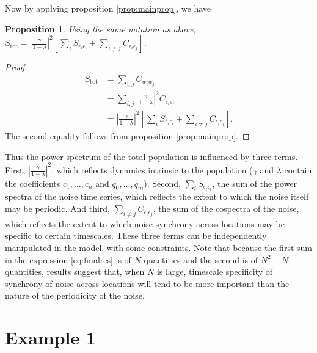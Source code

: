 \documentclass[letterpaper,11pt]{article}
\newtheorem{proposition}[theorem]{Proposition}
\begin{document}
Now by applying proposition \ref{prop:mainprop}, we have
\begin{proposition}
Using the same notation as above,
$S_{\text{tot}} = \left| \frac{\gamma}{1-\lambda} \right|^{ 2} \left[ \sum_i S_{\epsilon_{i}\epsilon_{i}} +\sum_{i \neq j} C_{\epsilon_{i}\epsilon_{j}}\right]$.
\label{prop:mainprop2}
\end{proposition}
\begin{proof}
\begin{align}
S_{\text{tot}} &= \sum_{i,j} C_{w_i w_j} \\
&= \sum_{i,j} \left| \frac{\gamma}{1-\lambda} \right|^{ 2} C_{\epsilon_{i}\epsilon_{j}} \\
&= \left| \frac{\gamma}{1-\lambda} \right|^{ 2} \left[ \sum_i S_{\epsilon_{i}\epsilon_{i}} +\sum_{i \neq j} C_{\epsilon_{i}\epsilon_{j}}\right].\label{eq:splitup}
\end{align}
The second equality follows from proposition \ref{prop:mainprop}.
\end{proof}

Thus the power spectrum of the total  population is influenced by three terms.
First, $\left| \frac{\gamma}{1-\lambda} \right|^{ 2}$, which reflects
dynamics intrinsic to the population ($\gamma$ and $\lambda$ contain
the coefficients $c_1,\ldots,c_n$ and $q_0,\ldots,q_m$). Second,
$\sum_i S_{\epsilon_{i}\epsilon_{i}}$, the  sum of the power
spectra of the noise time series, which reflects the extent to which the noise
itself may be periodic. And third, $\sum_{i \neq j} C_{\epsilon_{i}\epsilon_{j}}$,
the sum of the cospectra of the noise, which reflects the extent to which noise
synchrony across locations may be specific to certain timescales.
These three terms can be independently manipulated in the model, with some
constraints. Note that because the first sum in the expression 
\ref{eq:finalres} is of $N$ quantities and the
second is of $N^2 - N$ quantities, results 
suggest that, when $N$ is large, timescale specificity of
synchrony of noise across locations will tend to be more important than
the nature of the periodicity of the noise.

\section{Example 1}\label{sect:example1}
\end{document}
